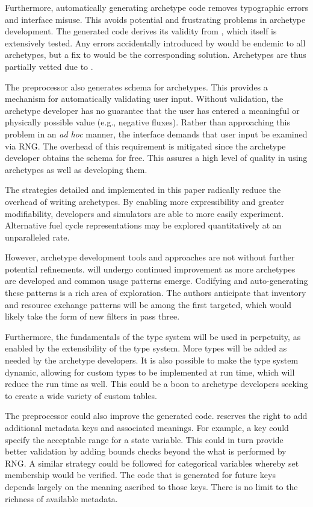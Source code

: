 Furthermore, automatically generating archetype code removes typographic errors and 
\cyclus interface misuse. This avoids potential and frustrating problems in 
archetype development. The 
generated code derives its validity from \cycpp, which itself is extensively 
tested. Any errors accidentally introduced by \cycpp would be endemic to all archetypes, 
but a fix to \cycpp would be the corresponding solution. Archetypes are thus 
partially vetted due to \cycpp.

The preprocessor also generates schema for archetypes. This provides a mechanism 
for automatically validating user input.  Without validation, the archetype 
developer has no guarantee that the user has entered a meaningful or physically possible 
value (e.g., negative fluxes). Rather than approaching this problem in an
\emph{ad hoc} 
manner, the \cyclus interface demands that user input be examined via \gls{RNG}.  The overhead 
of this requirement is mitigated since the archetype developer obtains the schema
for free. This assures a high level of quality in using archetypes as well as 
developing them.

The strategies detailed and implemented in this paper radically
reduce the overhead of writing archetypes. By enabling more expressibility and greater
modifiability, developers and simulators are able to more easily experiment.  
Alternative fuel cycle representations may be explored quantitatively at an
unparalleled rate.

However, archetype development tools and approaches are not without further 
potential refinements. \cycpp will undergo continued improvement 
as more archetypes are developed and common usage patterns emerge. Codifying and 
auto-generating these patterns is a rich area of exploration. The authors anticipate 
that inventory and resource exchange patterns will be among the first
targeted, 
which would likely take the form of new filters in pass three.

Furthermore, the fundamentals of the \cyclus type system will be used in 
perpetuity, as enabled by the extensibility of the type system.  More types
will be added as needed by the archetype developers.  It is also possible to 
make the type system dynamic, allowing for custom types to be implemented at run time,
which will reduce the run time as well.
This could be a boon to archetype developers seeking to create a wide variety of custom
tables.

The preprocessor could also improve the generated code. \Cyclus reserves the right
to add additional metadata keys and associated meanings.  For example, a 
key could specify the acceptable range for a state variable. This could in turn 
provide better validation by adding bounds checks beyond the what is performed
by \gls{RNG}. A similar strategy could be followed for categorical variables whereby
set membership would be verified. The code that is generated for future keys 
depends largely on the meaning ascribed to those keys. There is no limit 
to the richness of available metadata.

